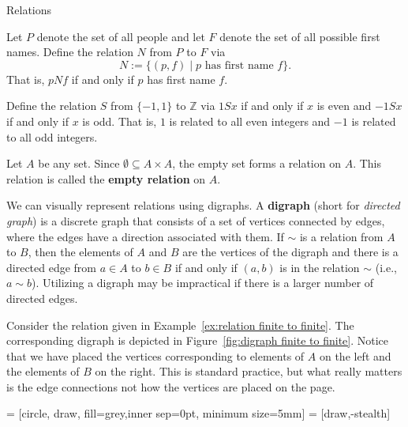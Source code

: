 \begin{section}{Relations}
\begin{example}
Let $P$ denote the set of all people and let $F$ denote the set of all possible first names.  Define the relation $N$ from $P$ to $F$ via
\[
N:=\{(p,f)\mid p\text{ has first name }f\}.
\]
That is, $pNf$ if and only if $p$ has first name $f$. 
\end{example}


\begin{example}
Define the relation $S$ from $\{-1,1\}$ to $\mathbb{Z}$ via $1Sx$ if and only if $x$ is even and $-1Sx$ if and only if $x$ is odd.  That is, $1$ is related to all even integers and $-1$ is related to all odd integers.
\end{example}

\begin{example}
Let $A$ be any set.  Since $\emptyset \subseteq A\times A$, the empty set forms a relation on $A$. This relation is called the \textbf{empty relation} on $A$.
\end{example}

We can visually represent relations using digraphs. A \textbf{digraph} (short for \emph{directed graph}) is a discrete graph that consists of a set of vertices connected by edges, where the edges have a direction associated with them. If $\sim$ is a relation from $A$ to $B$, then the elements of $A$ and $B$ are the vertices of the digraph and there is a directed edge from $a\in A$ to $b\in B$ if and only if $(a,b)$ is in the relation $\sim$ (i.e., $a\sim b$).  Utilizing a digraph may be impractical if there is a larger number of directed edges.

\begin{example}
Consider the relation given in Example~\ref{ex:relation finite to finite}.  The corresponding digraph is depicted in Figure~\ref{fig:digraph finite to finite}. Notice that we have placed the vertices corresponding to elements of $A$ on the left and the elements of $B$ on the right.  This is standard practice, but what really matters is the edge connections not how the vertices are placed on the page.
\end{example}

 = [circle, draw, fill=grey,inner sep=0pt, minimum size=5mm]
 = [draw,-stealth]


\end{section}
